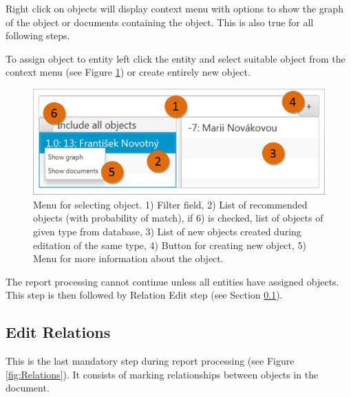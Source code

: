 Right click on objects will display context menu with options to show the graph
of the object or documents containing the object. This is also true for all following steps.

To assign object to entity left click the entity and select suitable object
from the context menu (see Figure \ref{fig:ObjectMenu}) or create entirely new
object.

\begin{figure}[!htb]
        \centering
        \includegraphics[width=\textwidth]{Images/objectmenu}
        \caption{Menu for selecting object. 1) Filter field, 2) List of
		 recommended objects (with probability of match), if 6) is checked, list
		 of objects of given type from database, 3) List of new objects created
		 during editation of the same type, 4) Button for creating new object,
		 5) Menu for more information about the object.}
        \label{fig:ObjectMenu}
\end{figure}

The report processing cannot continue unless all entities have assigned
objects. This step is then followed by Relation Edit step (see Section
\ref{sssec:EditRelations}).

\subsection{Edit Relations}
\label{sssec:EditRelations}

This is the last mandatory step during report processing (see Figure
\ref{fig:Relations}). It consists of marking relationships between objects in
the document.


